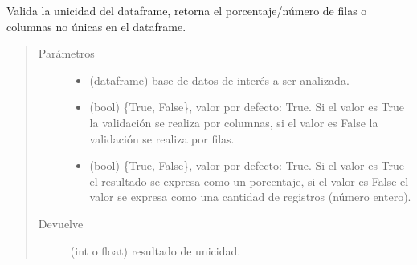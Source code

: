 \documentclass[letterpaper,10pt,openany,spanish]{sphinxmanual}
\begin{document}
\begin{fulllineitems}
\label{\detokenize{datos:datos.nounique}}
Valida la unicidad del dataframe, retorna el porcentaje/número de filas o columnas no únicas en el dataframe.
\begin{quote}\begin{description}
\item[{Parámetros}] \leavevmode\begin{itemize}
\item {} 
 \textendash{} (dataframe) base de datos de interés a ser analizada.

\item {} 
 \textendash{} (bool) \{True, False\}, valor por defecto: True. Si el valor es True la validación se realiza por columnas, si el valor es False la validación se realiza por filas.

\item {} 
 \textendash{} (bool) \{True, False\}, valor por defecto: True. Si el valor es True el resultado se expresa como un porcentaje, si el valor es False el valor se expresa como una cantidad de registros (número entero).

\end{itemize}

\item[{Devuelve}] \leavevmode
(int o float) resultado de unicidad.

\end{description}\end{quote}

\end{fulllineitems}

\end{document}
